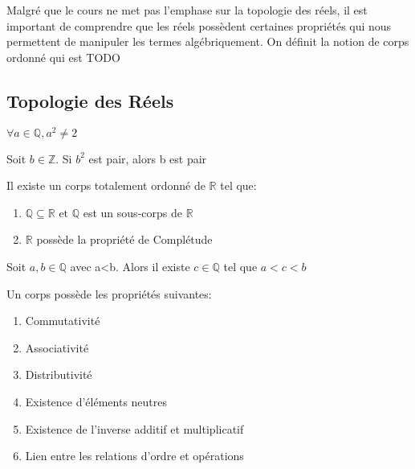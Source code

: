 \documentclass{article}
\begin{document}
Malgré que le cours ne met pas l'emphase sur la topologie des réels, il est
important de comprendre que les réels possèdent certaines propriétés qui nous
permettent de manipuler les termes algébriquement. On définit la notion de
corps ordonné qui est TODO

\subsection{Topologie des Réels}

\begin{proposition}
    $\forall a \in \mathbb{Q}, a^2 \neq 2$
\end{proposition}

\begin{lemma}
    Soit $b \in \mathbb{Z}$. Si $b^2$ est pair, alors b est pair
\end{lemma}

\begin{axiom}
    Il existe un corps totalement ordonné de $\mathbb{R}$ tel que:
    \begin{enumerate}
	\item $\mathbb{Q} \subseteq \mathbb{R} \text{ et } \mathbb{Q}$ est un sous-corps
	    de $\mathbb{R}$
	\item $\mathbb{R}$ possède la propriété de Complétude
    \end{enumerate}
\end{axiom}

\begin{proposition}
    Soit $a,b \in \mathbb{Q}$ avec a<b. Alors il existe $c \in \mathbb{Q}$ tel que
    $a<c<b$
\end{proposition}

\begin{theorem}
    Un corps possède les propriétés suivantes:
    \begin{enumerate}
	\item Commutativité
	\item Associativité
	\item Distributivité
	\item Existence d'éléments neutres
	\item Existence de l'inverse additif et multiplicatif
	\item Lien entre les relations d'ordre et opérations
    \end{enumerate}
\end{theorem}

\begin{problem}
\end{problem}
\end{document}
